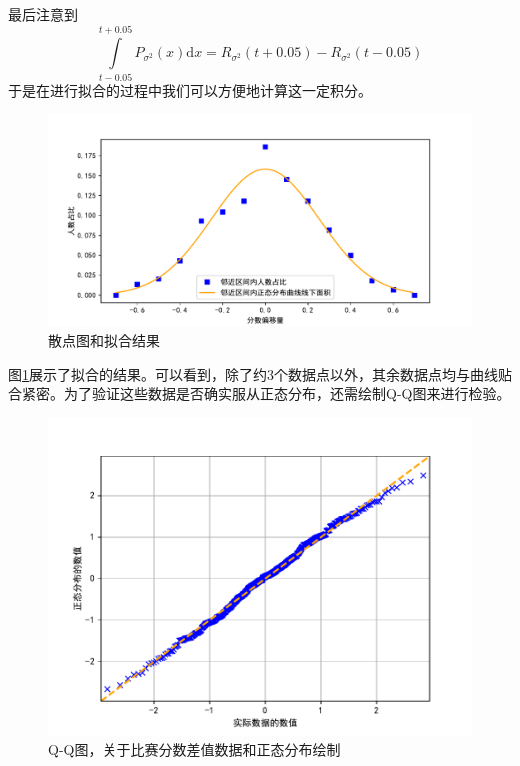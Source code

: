         最后注意到 $$\int\limits_{t-0.05}^{t+0.05} P_{\sigma^2}(x)\mathrm{d} x=R_{\sigma^2}(t+0.05)-R_{\sigma^2}(t-0.05)$$ 于是在进行拟合的过程中我们可以方便地计算这一定积分。

        \begin{figure}
            \centering
            \includegraphics[width=\textwidth]{fig/fittingOffsets.pdf}
            \caption{散点图和拟合结果}
            \label{fig:fittingOffsetsByNormalDistribution}
        \end{figure}

        \vspace{1.5ex}

        图\ref{fig:fittingOffsetsByNormalDistribution}展示了拟合的结果。可以看到，除了约$3$个数据点以外，其余数据点均与曲线贴合紧密。为了验证这些数据是否确实服从正态分布，还需绘制Q-Q图来进行检验。

        \begin{figure}
            \centering
            \includegraphics[width=\textwidth]{fig/QQPlot.pdf}
            \caption{Q-Q图，关于比赛分数差值数据和正态分布绘制}
            \label{fig:QQPlot}
        \end{figure}

